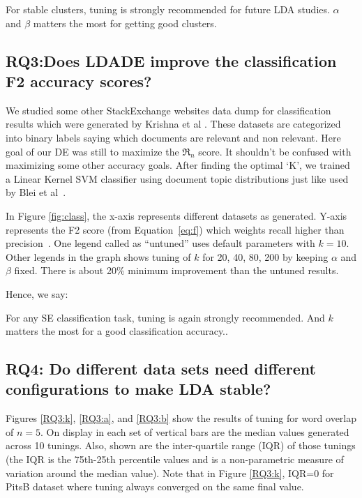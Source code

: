 \documentclass[twocolumn,5p,sort&compress]{elsarticle}
\newcommand{\eq}[1]{Equation~\ref{eq:#1}}
\theoremstyle{break}
\begin{document}
\begin{lesson}
For stable clusters, tuning is strongly recommended for future LDA studies. $\alpha$ and $\beta$ matters the most for getting good clusters.
\end{lesson}

\subsection{\textbf{RQ3:Does LDADE improve the classification F2 accuracy scores?}}\label{sect:rq3} 

We studied some other StackExchange websites data dump for classification results which were generated by Krishna et al \cite{krishna2016bigse}. These datasets are categorized into binary labels saying which documents are relevant and non relevant. Here goal of our DE was still to maximize the $\Re_n$ score. It shouldn't be confused with maximizing some other accuracy goals. After finding the optimal `K', we trained a Linear Kernel SVM classifier using document topic distributions just like used by Blei et al~\cite{blei2003latent}.

In Figure \ref{fig:class}, the x-axis represents different datasets as generated. Y-axis represents the F2 score
(from \eq{f}) which weights recall higher than precision~\cite{powers2011evaluation}. One legend called as ``untuned'' uses default parameters with $k=10$. Other legends in the graph shows tuning of $k$ for 20, 40, 80, 200 by keeping $\alpha$ and $\beta$ fixed. There is about 20\% minimum improvement than the untuned results.

\noindent
Hence, we say:

\begin{lesson}
For any SE classification task, tuning is again strongly recommended. And $k$ matters the most for a good classification accuracy..
\end{lesson}

\subsection{\textbf{RQ4: Do different data sets
      need different configurations to make LDA stable?}}\label{sect:diff}

Figures \ref{RQ3:k}, \ref{RQ3:a}, and \ref{RQ3:b} show the results of tuning for word overlap of $n=5$.
On display in each set of vertical bars are
the median values generated across 10 tunings.
Also, shown are
the inter-quartile range (IQR) of those tunings (the IQR is the 75th-25th percentile values and is a non-parametric measure of variation
around the median value). Note that in Figure \ref{RQ3:k}, IQR=0 for  PitsB dataset where tuning
          always converged on the same final value.
\end{document}
